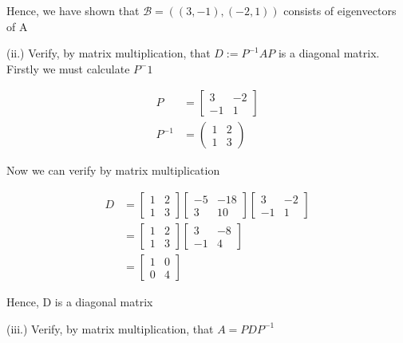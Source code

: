 \documentclass{article}
\begin{document}
Hence, we have shown that $ \mathcal{B}=((3,-1),(-2,1)) $ consists of eigenvectors of A

(ii.)
Verify, by matrix multiplication, that $D := P^{-1} A P$ is a diagonal matrix.
Firstly we must calculate $ P^-1  $

\begin{align*}
    P &= \begin{bmatrix}
        3 & -2 \\ -1 & 1
    \end{bmatrix} \\
    P^{-1} &=
    \begin{pmatrix}
        1 & 2 \\ 1 & 3
    \end{pmatrix}
\end{align*}

Now we can verify by matrix multiplication 

\begin{align*}
    D &= 
    \begin{bmatrix}
        1 & 2 \\ 1 & 3
    \end{bmatrix}
    \begin{bmatrix}
        -5 & -18\\ 3 & 10
    \end{bmatrix}
    \begin{bmatrix}
        3 & -2 \\ -1 & 1
    \end{bmatrix} \\
    &= 
    \begin{bmatrix}
        1 & 2 \\ 1 & 3
    \end{bmatrix}
    \begin{bmatrix}
        3 & -8 \\ -1 & 4
    \end{bmatrix} \\
    &=\begin{bmatrix}
        1 & 0 \\ 0 & 4
    \end{bmatrix}
\end{align*}

Hence, D is a diagonal matrix

(iii.)
Verify, by matrix multiplication, that $A = P D P^{-1}$
\end{document}
